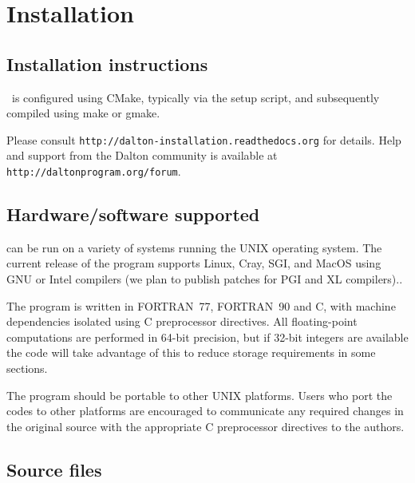 \chapter{Installation}\label{ch:install}

\section{Installation instructions}

\dalton\ is configured using CMake, typically via the setup script,
and subsequently compiled using make or gmake.

Please consult \verb|http://dalton-installation.readthedocs.org| for details.
Help and support from the Dalton community is available at \verb|http://daltonprogram.org/forum|.

\section{Hardware/software
supported}\label{sec:hardsoft}

{\dalton} can be run on a variety of systems running the UNIX operating system.
The current release of the program supports Linux, Cray, SGI,
and MacOS using GNU or Intel compilers (we plan to publish patches
for PGI and XL compilers)..

The program is written in FORTRAN~77,
FORTRAN~90 and C, with machine dependencies
isolated using C preprocessor directives.  All
floating-point computations are performed in 64-bit precision, but if 32-bit
integers are available the code will take advantage of this to reduce storage
requirements in some sections.

The program should be portable to other UNIX platforms.  Users
who port the codes to other platforms are encouraged to communicate any
required changes in the original source with the appropriate C preprocessor
directives to the authors.

\section{Source files}\label{sec:source}

